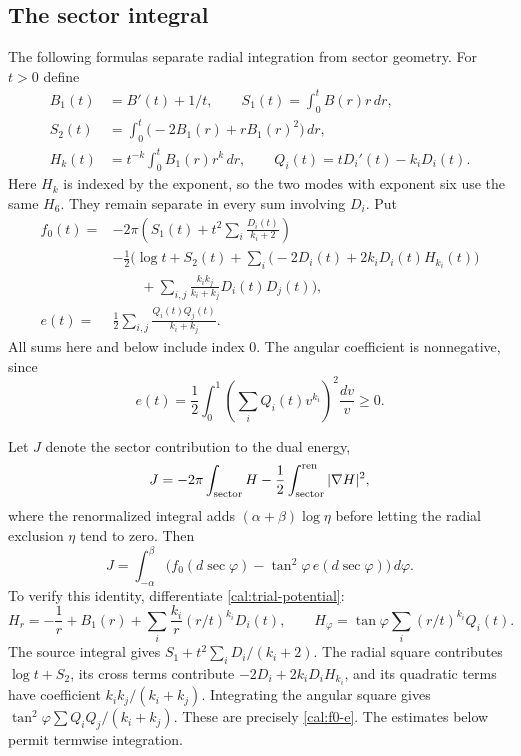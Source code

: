 \subsection{The sector integral}
The following formulas separate radial integration from sector geometry.
For $t>0$ define
\begin{equation}\label{cal:radial-integrals}
 \begin{split}
 B_1(t)&=B'(t)+1/t,\qquad S_1(t)=\int_0^t B(r)r\,dr,\\
 S_2(t)&=\int_0^t\bigl(-2B_1(r)+rB_1(r)^2\bigr)\,dr,\\
 H_k(t)&=t^{-k}\int_0^tB_1(r)r^k\,dr,\qquad
 Q_i(t)=tD_i'(t)-k_iD_i(t).
 \end{split}
\end{equation}
Here $H_k$ is indexed by the exponent, so the two modes with exponent
six use the same $H_6$.  They remain separate in every sum involving $D_i$.
Put
\begin{equation}\label{cal:f0-e}
 \begin{split}
 f_0(t)={}&-2\pi\left(S_1(t)+t^2\sum_i\frac{D_i(t)}{k_i+2}\right)\\
 &-\frac12\Biggl(\log t+S_2(t)
   +\sum_i\bigl(-2D_i(t)+2k_iD_i(t)H_{k_i}(t)\bigr)\\
 &\qquad+\sum_{i,j}\frac{k_ik_j}{k_i+k_j}D_i(t)D_j(t)\Biggr),\\
 e(t)={}&\frac12\sum_{i,j}\frac{Q_i(t)Q_j(t)}{k_i+k_j}.
 \end{split}
\end{equation}
All sums here and below include index $0$.
The angular coefficient is nonnegative, since
\begin{equation}\label{cal:positive-kernel}
 e(t)=\frac12\int_0^1
          \left(\sum_iQ_i(t)v^{k_i}\right)^2\frac{dv}{v}\ge0.
\end{equation}

Let $J$ denote the sector contribution to the dual energy,
\[
 J=-2\pi\int_{\rm sector}H
            -\frac12\int_{\rm sector}^{\rm ren}|\nabla H|^2,
\]
where the renormalized integral adds $(\alpha+\beta)\log\eta$ before
letting the radial exclusion $\eta$ tend to zero.  Then
\begin{equation}\label{cal:angle-density}
 J=\int_{-\alpha}^{\beta}
          \bigl(f_0(d\sec\varphi)-\tan^2\varphi\,e(d\sec\varphi)\bigr)
                                                                  \,d\varphi.
\end{equation}
To verify this identity, differentiate \eqref{cal:trial-potential}:
\[
 H_r=-\frac1r+B_1(r)+\sum_i\frac{k_i}{r}(r/t)^{k_i}D_i(t),\qquad
 H_\varphi=\tan\varphi\sum_i(r/t)^{k_i}Q_i(t).
\]
The source integral gives $S_1+t^2\sum_iD_i/(k_i+2)$.
The radial square contributes $\log t+S_2$, its cross terms contribute
$-2D_i+2k_iD_iH_{k_i}$, and its quadratic terms have coefficient
$k_ik_j/(k_i+k_j)$.  Integrating the angular square gives
$\tan^2\varphi\sum Q_iQ_j/(k_i+k_j)$.  These are precisely
\eqref{cal:f0-e}.  The estimates below permit termwise integration.

